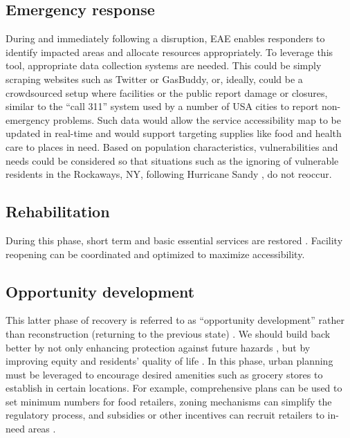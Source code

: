 \documentclass[onecolumn,doublespacing]{risa}
\let \cite \parencite
\begin{document}
\subsection{Emergency response}
During and immediately following a disruption, EAE enables responders to identify impacted areas and allocate resources appropriately. 
To leverage this tool, appropriate data collection systems are needed. 
This could be simply scraping websites such as Twitter or GasBuddy, or, ideally, could be a crowdsourced setup where facilities or the public report damage or closures, similar to the ``call 311'' system used by a number of USA cities to report non-emergency problems.
Such data would allow the service accessibility map to be updated in real-time and would support targeting supplies like food and health care to places in need. 
Based on population characteristics, vulnerabilities and needs could be considered so that situations such as the ignoring of vulnerable residents in the Rockaways, NY, following Hurricane Sandy \cite{Subaiya2014-qx}, do not reoccur. 

\subsection{Rehabilitation} 
During this phase, short term and basic essential services are restored \cite{Resendiz-Vazquez2019-ol}. 
Facility reopening can be coordinated and optimized to maximize accessibility. 

\subsection{Opportunity development}
This latter phase of recovery is referred to as “opportunity development” rather than reconstruction (returning to the previous state) \cite{Resendiz-Vazquez2019-ol,Pantelic1991-qu}. 
We should build back better \cite{Resendiz-Vazquez2019-ol} by not only enhancing protection against future hazards \cite{Platt2019-lx}, but by improving equity and residents’ quality of life \cite{Pantelic1991-qu}. 
In this phase, urban planning must be leveraged to encourage desired amenities such as grocery stores to establish in certain locations. 
For example, comprehensive plans can be used to set minimum numbers for food retailers, zoning mechanisms can simplify the regulatory process, and subsidies or other incentives can recruit retailers to in-need areas \cite{Raja2010-cm, Raja2008-wx}. 
\end{document}
